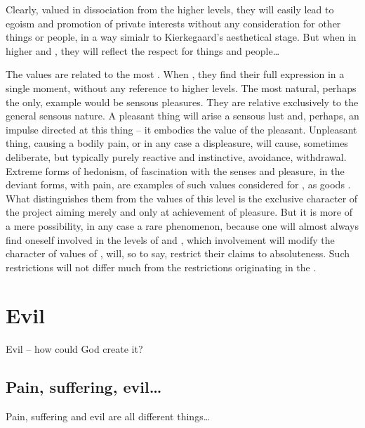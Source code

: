 {\subpa
Clearly, valued in dissociation from the higher levels, they will 
easily lead to egoism and promotion of  private interests 
without any consideration for other things or people, in a way 
simialr to Kierkegaard's aesthetical stage. 
But when  
in higher  and , they will reflect the respect 
for things and people\ldots

\pa \imm The  values are related to the most .  When , they find their full expression in
a single moment, without any reference to higher levels.  The most
natural, perhaps the only, example would be sensous pleasures.  They
are relative exclusively to the general sensous nature.  A pleasant
thing will arise a sensous lust and, perhaps, an impulse directed at
this thing -- it embodies the value of the pleasant.  Unpleasant
thing, causing a bodily pain, or in any case a displeasure, will
cause, sometimes deliberate, but typically purely reactive and
instinctive, avoidance, withdrawal.  Extreme forms of hedonism, of
fascination with the senses and pleasure, in the deviant forms, with
pain, are examples of such values considered for ,
as goods .  What distinguishes them from the
 values of this level is the exclusive
character of the project aiming merely and only at achievement of
pleasure.  But it is more of a mere possibility, in any case a rare
phenomenon, because one will almost always find oneself involved in the
levels of  and , which involvement will
modify the character of values of , will, so to say,
restrict their claims to absoluteness.  Such restrictions will not
differ much from the restrictions originating in the .



\section{Evil}

\pa
Evil -- how could God create it? 



\subsection{Pain, suffering, evil\ldots}
\pa
Pain, suffering and evil are all different things\ldots

}
